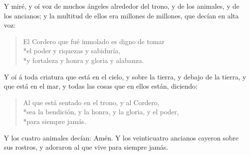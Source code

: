 Y miré, y oí voz de muchos ángeles alrededor del trono, y de los animales, y de los ancianos; y la multitud de ellos era millones de millones,%
que decían en alta voz:
\begin{verse}
El Cordero que fué inmolado es digno de tomar\\*\vin el poder y riquezas y sabiduría,\\*\vin  y fortaleza y honra y gloria y alabanza.
\end{verse}
Y oí á toda criatura que está en el cielo, y sobre la tierra, y debajo de la tierra, y que está en el mar, y todas las cosas que en ellos están, diciendo:
\begin{verse}
Al que está sentado en el trono, y al Cordero,\\*\vin sea la bendición, y la honra, y la gloria, y el poder,\\*\vin para siempre jamás.
\end{verse}
Y los cuatro animales decían: Amén. Y los veinticuatro ancianos cayeron sobre sus rostros, y adoraron al que vive para siempre jamás.
